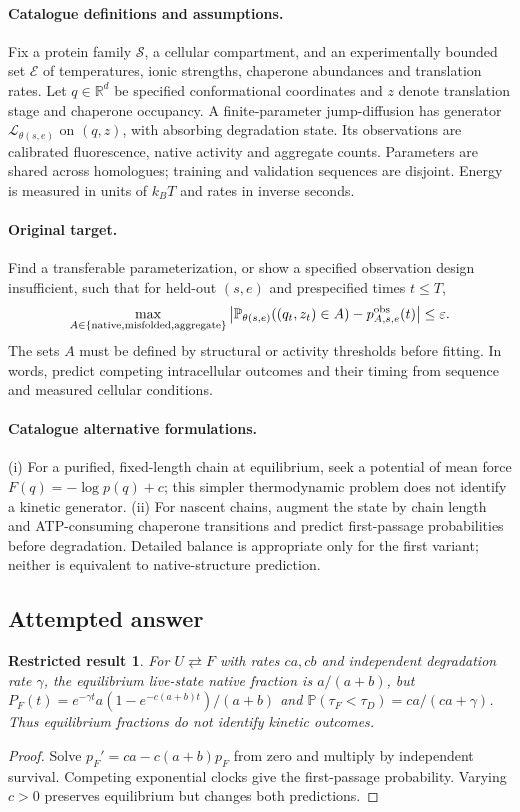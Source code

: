 \documentclass[11pt]{article}
\newcommand{\R}{\mathbb R}
\newcommand{\Prob}{\mathbb P}
\providecommand{\R}{\mathbb R}
\providecommand{\Prob}{\mathbb P}
\newtheorem{attemptresult}{Restricted result}[section]
\begin{document}
\paragraph{Catalogue definitions and assumptions.}
Fix a protein family $\mathcal S$, a cellular compartment, and an experimentally bounded set $\mathcal E$ of temperatures, ionic strengths, chaperone abundances and translation rates. Let $q\in\R^d$ be specified conformational coordinates and $z$ denote translation stage and chaperone occupancy. A finite-parameter jump-diffusion has generator $\mathcal L_{\theta(s,e)}$ on $(q,z)$, with absorbing degradation state. Its observations are calibrated fluorescence, native activity and aggregate counts. Parameters are shared across homologues; training and validation sequences are disjoint. Energy is measured in units of $k_BT$ and rates in inverse seconds.
\paragraph{Original target.}
Find a transferable parameterization, or show a specified observation design insufficient, such that for held-out $(s,e)$ and prespecified times $t\leq T$,
\[
\max_{A\in\{\mathrm{native},\mathrm{misfolded},\mathrm{aggregate}\}}
\left|\Prob_{\theta(s,e)}((q_t,z_t)\in A)-p^{\rm obs}_{A,s,e}(t)\right|\leq\varepsilon.
\]
The sets $A$ must be defined by structural or activity thresholds before fitting. In words, predict competing intracellular outcomes and their timing from sequence and measured cellular conditions.
\paragraph{Catalogue alternative formulations.}
(i) For a purified, fixed-length chain at equilibrium, seek a potential of mean force $F(q)=-\log p(q)+c$; this simpler thermodynamic problem does not identify a kinetic generator. (ii) For nascent chains, augment the state by chain length and ATP-consuming chaperone transitions and predict first-passage probabilities before degradation. Detailed balance is appropriate only for the first variant; neither is equivalent to native-structure prediction.
\subsection{Attempted answer}
\begin{attemptresult}
For $U\rightleftarrows F$ with rates $ca,cb$ and independent degradation rate $\gamma$, the equilibrium live-state native fraction is $a/(a+b)$, but $P_F(t)=e^{-\gamma t}a(1-e^{-c(a+b)t})/(a+b)$ and $\Prob(\tau_F<\tau_D)=ca/(ca+\gamma)$. Thus equilibrium fractions do not identify kinetic outcomes.
\end{attemptresult}
\begin{proof}
Solve $p_F\prime=ca-c(a+b)p_F$ from zero and multiply by independent survival. Competing exponential clocks give the first-passage probability. Varying $c>0$ preserves equilibrium but changes both predictions.
\end{proof}
\end{document}
